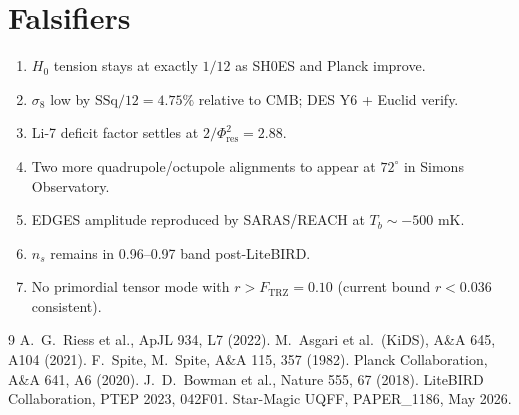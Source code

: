 \documentclass[11pt]{article}
\newcommand{\Ftrz}{F_{\mathrm{TRZ}}}
\newcommand{\Phires}{\Phi_{\mathrm{res}}}
\newcommand{\SSq}{\mathrm{SSq}}
\begin{document}
\section{Falsifiers}
\begin{enumerate}[label=(F\arabic*)]
\item $H_0$ tension stays at exactly $1/12$ as SH0ES and Planck improve.
\item $\sigma_8$ low by $\SSq/12=4.75\%$ relative to CMB; DES Y6 + Euclid verify.
\item Li-7 deficit factor settles at $2/\Phires^2=2.88$.
\item Two more quadrupole/octupole alignments to appear at $72^\circ$ in Simons Observatory.
\item EDGES amplitude reproduced by SARAS/REACH at $T_b\sim-500$ mK.
\item $n_s$ remains in 0.96--0.97 band post-LiteBIRD.
\item No primordial tensor mode with $r>\Ftrz=0.10$ (current bound $r<0.036$ consistent).
\end{enumerate}

\begin{thebibliography}{9}
 A.\ G.\ Riess et al., ApJL 934, L7 (2022).
 M.\ Asgari et al.\ (KiDS), A\&A 645, A104 (2021).
 F.\ Spite, M.\ Spite, A\&A 115, 357 (1982).
 Planck Collaboration, A\&A 641, A6 (2020).
 J.\ D.\ Bowman et al., Nature 555, 67 (2018).
 LiteBIRD Collaboration, PTEP 2023, 042F01.
 Star-Magic UQFF, PAPER\_1186, May 2026.
\end{thebibliography}
\end{document}
